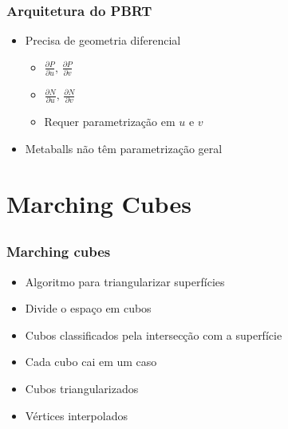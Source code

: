 \documentclass[brazil]{beamer}
\begin{document}
    \begin{frame}
      \frametitle{Arquitetura do PBRT}
      \begin{itemize}
        \item Precisa de geometria diferencial
        \begin{itemize}
          \vspace{0.2em}
          \item $ \frac{\partial P}{\partial u}\text{, }\frac{\partial P}{\partial v}$
          \vspace{0.2em}
          \item $ \frac{\partial N}{\partial u}\text{, }\frac{\partial N}{\partial v}$
          \vspace{0.2em}
          \item Requer parametrização em $u$ e $v$
        \end{itemize}
        \item Metaballs não têm parametrização geral
      \end{itemize}
    \end{frame}    


  \section{Marching Cubes}
  
    \subsection{}
    
    \begin{frame}
      \frametitle{Marching cubes}
      \begin{itemize}
        \item Algoritmo para triangularizar superfícies
        \item Divide o espaço em cubos
        \item Cubos classificados pela intersecção com a superfície
        \item Cada cubo cai em um caso
        \item Cubos triangularizados
        \item Vértices interpolados
      \end{itemize}
    \end{frame}    
\end{document}
